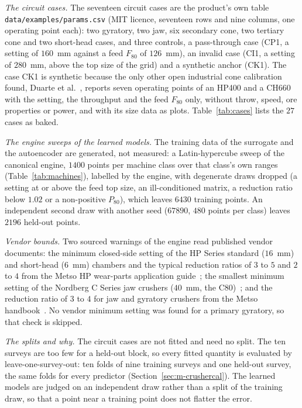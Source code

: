 \emph{The circuit cases.} The seventeen circuit cases are the product's own table \texttt{data/\allowbreak{}examples/\allowbreak{}params.csv} (MIT
licence, seventeen rows and nine columns, one operating point each): two gyratory, two jaw, six secondary cone, two tertiary
cone and two short-head cases, and three controls, a pass-through case (CP1, a setting of $160$~mm against a feed $F_{80}$ of
$126$~mm), an invalid case (CI1, a setting of $280$~mm, above the top size of the grid) and a synthetic anchor (CK1). The case
CK1 is synthetic because the only other open industrial cone calibration found, Duarte et al.~\cite{duarte2021}, reports
seven operating points of an HP400 and a CH660 with the setting, the throughput and the feed $F_{80}$ only, without throw,
speed, ore properties or power, and with its size data as plots. Table~\ref{tab:cases} lists the $27$ cases as baked.

\emph{The engine sweeps of the learned models.} The training data of the surrogate and the autoencoder are generated, not
measured: a Latin-hypercube sweep of the canonical engine, $1400$ points per machine class over that class's own ranges
(Table~\ref{tab:machines}), labelled by the engine, with degenerate draws dropped (a setting at or above the feed top size, an
ill-conditioned matrix, a reduction ratio below $1.02$ or a non-positive $P_{80}$), which leaves $6430$ training points. An
independent second draw with another seed ($67890$, $480$ points per class) leaves $2196$ held-out points.

\emph{Vendor bounds.} Two sourced warnings of the engine read published vendor documents: the minimum closed-side setting of
the HP Series standard ($16$~mm) and short-head ($6$~mm) chambers and the typical reduction ratios of $3$ to $5$ and $2$ to
$4$ from the Metso HP wear-parts application guide~\cite{metsoHP}; the smallest minimum setting of the Nordberg C Series jaw
crushers ($40$~mm, the C80)~\cite{metsoC}; and the reduction ratio of $3$ to $4$ for jaw and gyratory crushers from the Metso
handbook~\cite{metsoBasics}. No vendor minimum setting was found for a primary gyratory, so that check is skipped.

\emph{The splits and why.} The circuit cases are not fitted and need no split. The ten surveys are too few for a held-out
block, so every fitted quantity is evaluated by leave-one-survey-out: ten folds of nine training surveys and one held-out
survey, the same folds for every predictor (Section~\ref{sec:m-crushercal}). The learned models are judged on an independent
draw rather than a split of the training draw, so that a point near a training point does not flatter the error.

